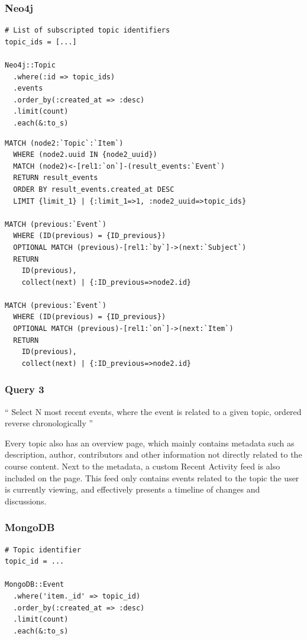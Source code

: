 
\subsubsection*{Neo4j}

\begin{verbatim}
# List of subscripted topic identifiers
topic_ids = [...]

Neo4j::Topic
  .where(:id => topic_ids)
  .events
  .order_by(:created_at => :desc)
  .limit(count)
  .each(&:to_s)
\end{verbatim}

\begin{verbatim}
MATCH (node2:`Topic`:`Item`)
  WHERE (node2.uuid IN {node2_uuid})
  MATCH (node2)<-[rel1:`on`]-(result_events:`Event`)
  RETURN result_events
  ORDER BY result_events.created_at DESC
  LIMIT {limit_1} | {:limit_1=>1, :node2_uuid=>topic_ids}

MATCH (previous:`Event`)
  WHERE (ID(previous) = {ID_previous})
  OPTIONAL MATCH (previous)-[rel1:`by`]->(next:`Subject`)
  RETURN
    ID(previous),
    collect(next) | {:ID_previous=>node2.id}

MATCH (previous:`Event`)
  WHERE (ID(previous) = {ID_previous})
  OPTIONAL MATCH (previous)-[rel1:`on`]->(next:`Item`)
  RETURN
    ID(previous),
    collect(next) | {:ID_previous=>node2.id}
\end{verbatim}

\subsubsection{Query 3}
\label{subsubsec:query-3}

``
Select N most recent events, where the event is related to a given topic, ordered reverse chronologically
''

Every topic also has an overview page, which mainly contains metadata such as description, author, contributors and other information not directly related to the course content.
Next to the metadata, a custom Recent Activity feed is also included on the page.
This feed only contains events related to the topic the user is currently viewing, and effectively presents a timeline of changes and discussions.

\subsubsection*{MongoDB}

\begin{verbatim}
# Topic identifier
topic_id = ...

MongoDB::Event
  .where('item._id' => topic_id)
  .order_by(:created_at => :desc)
  .limit(count)
  .each(&:to_s)
\end{verbatim}

